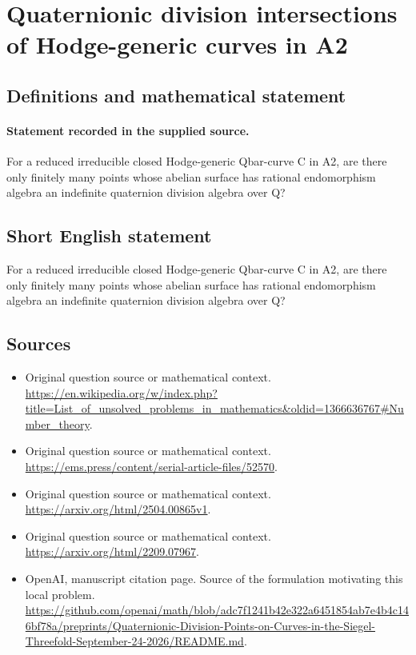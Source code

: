 \documentclass[11pt]{article}
\begin{document}
\section*{Quaternionic division intersections of Hodge-generic curves in A2}\label{statement}
\subsection{Definitions and mathematical statement}
\paragraph{Statement recorded in the supplied source.}
For a reduced irreducible closed Hodge-generic Qbar-curve C in A2, are there only finitely many points whose abelian surface has rational endomorphism algebra an indefinite quaternion division algebra over Q?
\subsection{Short English statement}
For a reduced irreducible closed Hodge-generic Qbar-curve C in A2, are there only finitely many points whose abelian surface has rational endomorphism algebra an indefinite quaternion division algebra over Q?
\subsection{Sources}
\begin{itemize}
\item[S1] Original question source or mathematical context.
\url{https://en.wikipedia.org/w/index.php?title=List_of_unsolved_problems_in_mathematics&oldid=1366636767#Number_theory}.
\item[S2] Original question source or mathematical context.
\url{https://ems.press/content/serial-article-files/52570}.
\item[S3] Original question source or mathematical context.
\url{https://arxiv.org/html/2504.00865v1}.
\item[S4] Original question source or mathematical context.
\url{https://arxiv.org/html/2209.07967}.
\item[S5] OpenAI, manuscript citation page. Source of the formulation motivating this local problem.
\url{https://github.com/openai/math/blob/adc7f1241b42e322a6451854ab7e4b4c146bf78a/preprints/Quaternionic-Division-Points-on-Curves-in-the-Siegel-Threefold-September-24-2026/README.md}.
\end{itemize}
\end{document}

